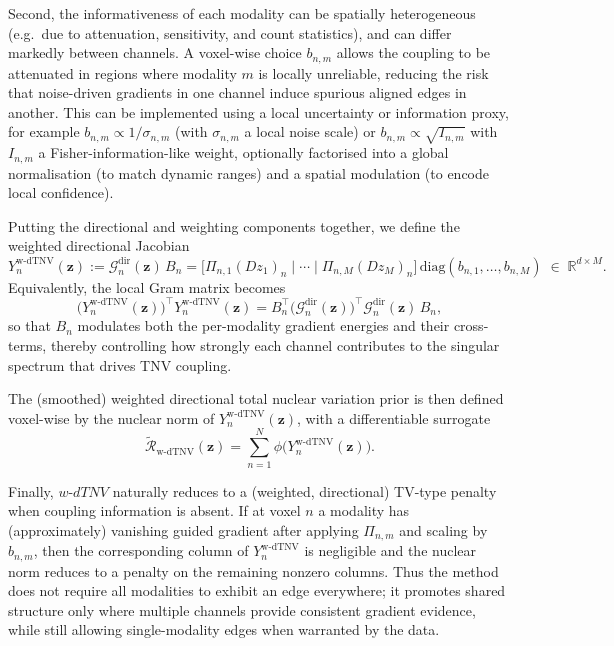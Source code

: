 Second, the informativeness of each modality can be spatially heterogeneous (e.g.\ due to attenuation, sensitivity, and count statistics), and can differ markedly between channels. A voxel-wise choice $b_{n,m}$ allows the coupling to be attenuated in regions where modality $m$ is locally unreliable, reducing the risk that noise-driven gradients in one channel induce spurious aligned edges in another. This can be implemented using a local uncertainty or information proxy, for example $b_{n,m}\propto 1/\sigma_{n,m}$ (with $\sigma_{n,m}$ a local noise scale) or $b_{n,m}\propto \sqrt{I_{n,m}}$ with $I_{n,m}$ a Fisher-information-like weight, optionally factorised into a global normalisation (to match dynamic ranges) and a spatial modulation (to encode local confidence).

Putting the directional and weighting components together, we define the weighted directional Jacobian
\begin{equation}
Y^{\mathrm{w\text{-}dTNV}}_n(\bm{z})
:=
\mathcal{G}^{\mathrm{dir}}_n(\bm{z})\,B_n
=
\bigl[\Pi_{n,1}(D z_1)_n \;|\; \cdots \;|\; \Pi_{n,M}(D z_M)_n\bigr]\,
\mathrm{diag}(b_{n,1},\ldots,b_{n,M})
\;\in\;\mathbb{R}^{d\times M}.
\end{equation}
Equivalently, the local Gram matrix becomes
\begin{equation}
\bigl(Y^{\mathrm{w\text{-}dTNV}}_n(\bm{z})\bigr)^\top Y^{\mathrm{w\text{-}dTNV}}_n(\bm{z})
=
B_n^\top \bigl(\mathcal{G}^{\mathrm{dir}}_n(\bm{z})\bigr)^\top \mathcal{G}^{\mathrm{dir}}_n(\bm{z})\,B_n,
\end{equation}
so that $B_n$ modulates both the per-modality gradient energies and their cross-terms, thereby controlling how strongly each channel contributes to the singular spectrum that drives TNV coupling.

The (smoothed) weighted directional total nuclear variation prior is then defined voxel-wise by the nuclear norm of $Y^{\mathrm{w\text{-}dTNV}}_n(\bm{z})$, with a differentiable surrogate
\begin{equation}
\tilde{\mathcal{R}}_{\mathrm{w\text{-}dTNV}}(\bm{z})
=
\sum_{n=1}^{N} \phi\bigl(Y^{\mathrm{w\text{-}dTNV}}_n(\bm{z})\bigr).
\end{equation}

Finally, $w\text{-}dTNV$ naturally reduces to a (weighted, directional) TV-type penalty when coupling information is absent. If at voxel $n$ a modality has (approximately) vanishing guided gradient after applying $\Pi_{n,m}$ and scaling by $b_{n,m}$, then the corresponding column of $Y^{\mathrm{w\text{-}dTNV}}_n$ is negligible and the nuclear norm reduces to a penalty on the remaining nonzero columns. Thus the method does not require all modalities to exhibit an edge everywhere; it promotes shared structure only where multiple channels provide consistent gradient evidence, while still allowing single-modality edges when warranted by the data.

